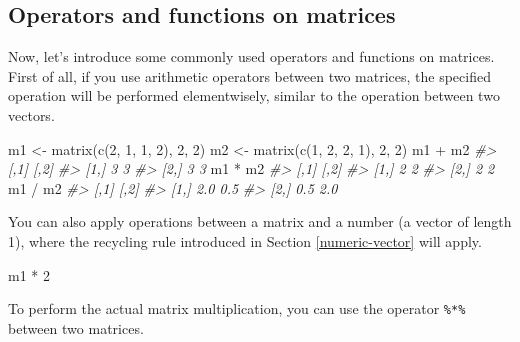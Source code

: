 \documentclass[
]{book}
\newenvironment{Shaded}{\begin{snugshade}}{\end{snugshade}}
\newcommand{\CommentTok}[1]{\textcolor[rgb]{0.56,0.35,0.01}{\textit{#1}}}
\newcommand{\DecValTok}[1]{\textcolor[rgb]{0.00,0.00,0.81}{#1}}
\newcommand{\FunctionTok}[1]{\textcolor[rgb]{0.00,0.00,0.00}{#1}}
\newcommand{\NormalTok}[1]{#1}
\newcommand{\OtherTok}[1]{\textcolor[rgb]{0.56,0.35,0.01}{#1}}
\newcommand{\SpecialCharTok}[1]{\textcolor[rgb]{0.00,0.00,0.00}{#1}}
\begin{document}
\hypertarget{operators-and-functions-on-matrices}{%
\subsection{Operators and functions on matrices}\label{operators-and-functions-on-matrices}}

Now, let's introduce some commonly used operators and functions on matrices. First of all, if you use arithmetic operators between two matrices, the specified operation will be performed elementwisely, similar to the operation between two vectors.

\begin{Shaded}
\begin{Highlighting}[]
\NormalTok{m1 }\OtherTok{\textless{}{-}} \FunctionTok{matrix}\NormalTok{(}\FunctionTok{c}\NormalTok{(}\DecValTok{2}\NormalTok{, }\DecValTok{1}\NormalTok{, }\DecValTok{1}\NormalTok{, }\DecValTok{2}\NormalTok{), }\DecValTok{2}\NormalTok{, }\DecValTok{2}\NormalTok{)}
\NormalTok{m2 }\OtherTok{\textless{}{-}} \FunctionTok{matrix}\NormalTok{(}\FunctionTok{c}\NormalTok{(}\DecValTok{1}\NormalTok{, }\DecValTok{2}\NormalTok{, }\DecValTok{2}\NormalTok{, }\DecValTok{1}\NormalTok{), }\DecValTok{2}\NormalTok{, }\DecValTok{2}\NormalTok{)}
\NormalTok{m1 }\SpecialCharTok{+}\NormalTok{ m2}
\CommentTok{\#\textgreater{}      [,1] [,2]}
\CommentTok{\#\textgreater{} [1,]    3    3}
\CommentTok{\#\textgreater{} [2,]    3    3}
\NormalTok{m1 }\SpecialCharTok{*}\NormalTok{ m2}
\CommentTok{\#\textgreater{}      [,1] [,2]}
\CommentTok{\#\textgreater{} [1,]    2    2}
\CommentTok{\#\textgreater{} [2,]    2    2}
\NormalTok{m1 }\SpecialCharTok{/}\NormalTok{ m2}
\CommentTok{\#\textgreater{}      [,1] [,2]}
\CommentTok{\#\textgreater{} [1,]  2.0  0.5}
\CommentTok{\#\textgreater{} [2,]  0.5  2.0}
\end{Highlighting}
\end{Shaded}

You can also apply operations between a matrix and a number (a vector of length 1), where the recycling rule introduced in Section \ref{numeric-vector} will apply.

\begin{Shaded}
\begin{Highlighting}[]
\NormalTok{m1 }\SpecialCharTok{*} \DecValTok{2}
\end{Highlighting}
\end{Shaded}

To perform the actual matrix multiplication, you can use the operator \texttt{\%*\%} between two matrices.
\end{document}
